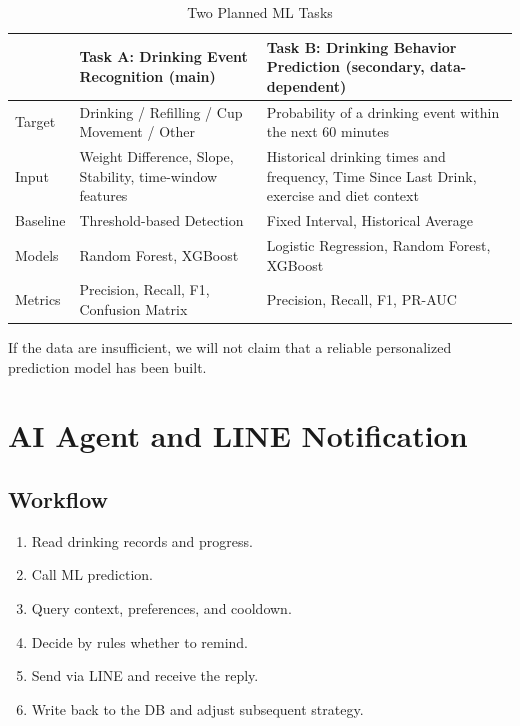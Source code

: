\documentclass[conference]{IEEEtran}
\begin{document}
\begin{table}[htbp]
\caption{Two Planned ML Tasks}
\label{tab:ml}
\centering
\footnotesize
\begin{tabular}{@{}p{}p{}p{}@{}}
\toprule
 & \textbf{Task A: Drinking Event Recognition (main)} & \textbf{Task B: Drinking Behavior Prediction (secondary, data-dependent)} \\
\midrule
Target & Drinking / Refilling / Cup Movement / Other & Probability of a drinking event within the next 60 minutes \\
\midrule
Input & Weight Difference, Slope, Stability, time-window features & Historical drinking times and frequency, Time Since Last Drink, exercise and diet context \\
\midrule
Baseline & Threshold-based Detection & Fixed Interval, Historical Average \\
\midrule
Models & Random Forest, XGBoost & Logistic Regression, Random Forest, XGBoost \\
\midrule
Metrics & Precision, Recall, F1, Confusion Matrix & Precision, Recall, F1, PR-AUC \\
\bottomrule
\end{tabular}
\end{table}

If the data are insufficient, we will not claim that a reliable personalized prediction model has been built.

\section{AI Agent and LINE Notification}

\subsection{Workflow}
\begin{enumerate}
\item Read drinking records and progress.
\item Call ML prediction.
\item Query context, preferences, and cooldown.
\item Decide by rules whether to remind.
\item Send via LINE and receive the reply.
\item Write back to the DB and adjust subsequent strategy.
\end{enumerate}
\end{document}
